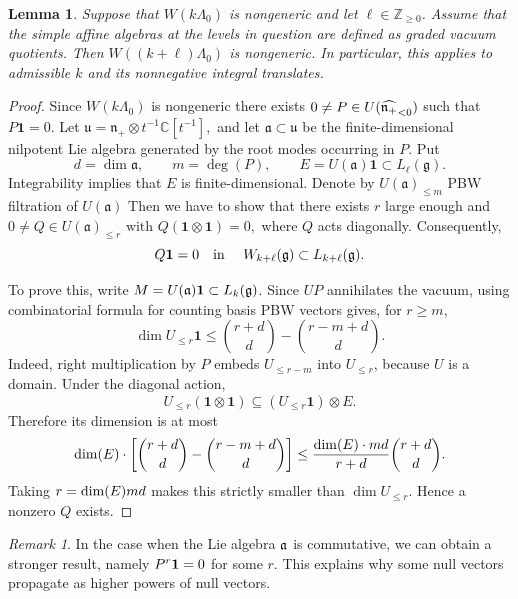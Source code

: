 \documentclass[11pt]{amsart}
\newtheorem{lemma}[theorem]{Lemma}
\theoremstyle{definition}
\theoremstyle{remark}
\newtheorem{remark}[theorem]{Remark}
\newcommand{\Z}{\mathbb Z}
\newcommand{\vac}{\mathbf1}
\begin{document}
\begin{lemma}\label{lem:propagation}
Suppose that $W(k\Lambda_0)$ is nongeneric and let $\ell\in\Z_{\ge0}$.
Assume that the simple affine algebras at the levels in question are
defined as graded vacuum quotients. Then $W((k+\ell)\Lambda_0)$ is
nongeneric. In particular, this applies to admissible $k$ and its
nonnegative integral translates.
\end{lemma}
\begin{proof}
Since $W(k\Lambda_0)$ is nongeneric there exists $0 \neq P \in U(\widehat{\frak n_+}_{< 0})$ such that $P \vac=0$. Let
$
\mathfrak u=\mathfrak n_+\otimes t^{-1}\mathbb C[t^{-1}],
$
and let \(\mathfrak a\subset\mathfrak u\) be the finite-dimensional nilpotent Lie algebra generated by the root modes occurring in \(P\). Put
\[
d=\dim\mathfrak a,\qquad m=\deg(P),\qquad
E=U(\mathfrak a)\mathbf1\subset L_\ell(\mathfrak g).
\]
Integrability implies that $E$ is finite-dimensional.
Denote by $U(\mathfrak a)_{\le m}$ PBW  filtration of $U(\mathfrak a)$
Then we have to show that there exists $r$ large enough and 
$0\ne Q\in U(\mathfrak a)_{\le r}
\text{ with }
Q(\mathbf1\otimes\mathbf1)=0,
$
where \(Q\) acts diagonally. Consequently,
\[
Q\mathbf1=0\quad\text{in } \quad W_{k+\ell}(\frak g) \subset L_{k+\ell}(\mathfrak g).
\]

To prove this, write  \(M=U(\frak a) \mathbf1\subset L_k(\mathfrak g)\). Since \(UP\) annihilates the vacuum, using combinatorial formula for counting 
basis PBW vectors gives, for \(r\ge m\),
\[
\dim U_{\le r}\mathbf1
\le
\binom{r+d}{d}-\binom{r-m+d}{d}.
\]
Indeed, right multiplication by \(P\) embeds \(U_{\le r-m}\) into \(U_{\le r}\), because \(U\) is a domain. Under the diagonal action,
\[
U_{\le r}(\mathbf1\otimes\mathbf1)
\subseteq (U_{\le r}\mathbf1)\otimes E.
\]
Therefore its dimension is at most
\[
{\rm dim}(E) \cdot \left[\binom{r+d}{d}-\binom{r-m+d}{d}\right]
\le
\frac{{\rm dim}(E) \cdot md}{r+d}\binom{r+d}{d}.
\]
Taking \(r={\rm dim}(E)md\) makes this strictly smaller than \(\dim U_{\le r}\). Hence a nonzero \(Q\) exists. \end{proof}

\begin{remark} In the case when the Lie algebra $\frak a$ is commutative, we can obtain a stronger result, namely $P^r {\bf 1}=0$ for some $r$. This explains why some null vectors propagate as higher powers of null vectors.
\end{remark}
\end{document}
